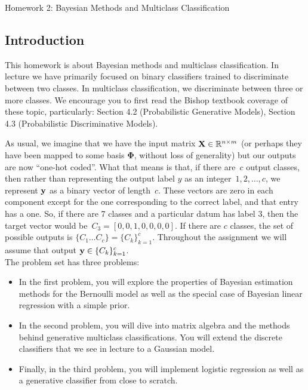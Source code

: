 \documentclass[submit]{harvardml}
\begin{document}
{
  \begin{center}
{\Large Homework 2: Bayesian Methods and Multiclass Classification}\\
\end{center}
}
\subsection*{Introduction}

This homework is about Bayesian methods
and  multiclass classification. In lecture we have
primarily focused on binary classifiers trained to discriminate
between two classes. In multiclass classification, we discriminate
between three or more classes. We encourage you to first read the
Bishop textbook coverage of these topic, particularly: Section 4.2
(Probabilistic Generative Models), Section 4.3 (Probabilistic
Discriminative Models).

As usual, we imagine that we have the input matrix $\mathbf{X} \in
\mathbb{R}^{n \times m}$ (or perhaps they have been mapped to some basis
$\bm{\Phi}$, without loss of generality) but our outputs are now
``one-hot coded''.  What that means is that, if there are~$c$ output
classes, then rather than representing the output label $y$ as an
integer~${1,2,\ldots,c}$, we represent $\mathbf{y}$ as a binary vector of
length~$c$. These vectors are zero in each
component except for the one corresponding to the correct label, and
that entry has a one.  So, if there are 7 classes and a particular
datum has label 3, then the target vector would be~${C_3 = [0,0,1,0,0,0,0]}$.
If there are $c$ classes, the set of possible outputs is $\{C_1 \ldots C_c \} = \{C_k\}_{k=1}^c$.
Throughout the assignment we will assume
that output $\mathbf{y} \in \{C_k\}_{k=1}^c$.\\

The problem set has three problems:
\begin{itemize}
\item In the first problem, you will explore the properties of Bayesian
estimation methods for the Bernoulli model as well as the special
case of Bayesian linear regression with a simple prior.
%
\item  In the second
problem, you will dive into  matrix algebra and the methods behind
generative multiclass classifications. You will extend the discrete classifiers
that we see in  lecture to a Gaussian model.
%
\item Finally, in the third problem, you will implement
 logistic regression as well as a generative classifier
from close to scratch.
%
\end{itemize}
\end{document}
